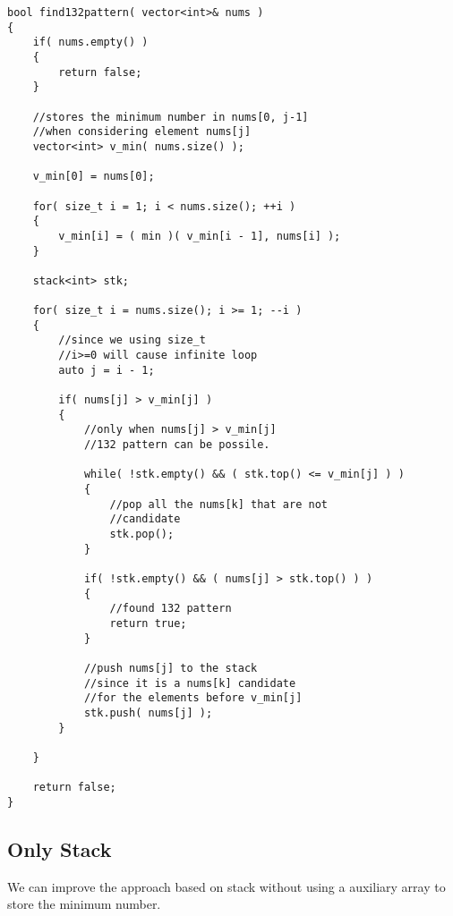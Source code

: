 \begin{lstlisting}[style=customc, caption={Stack With Minimum Number Array}]
bool find132pattern( vector<int>& nums )
{
    if( nums.empty() )
    {
        return false;
    }

    //stores the minimum number in nums[0, j-1]
    //when considering element nums[j]
    vector<int> v_min( nums.size() );

    v_min[0] = nums[0];

    for( size_t i = 1; i < nums.size(); ++i )
    {
        v_min[i] = ( min )( v_min[i - 1], nums[i] );
    }

    stack<int> stk;

    for( size_t i = nums.size(); i >= 1; --i )
    {
        //since we using size_t
        //i>=0 will cause infinite loop
        auto j = i - 1;

        if( nums[j] > v_min[j] )
        {
            //only when nums[j] > v_min[j]
            //132 pattern can be possile.

            while( !stk.empty() && ( stk.top() <= v_min[j] ) )
            {
                //pop all the nums[k] that are not
                //candidate
                stk.pop();
            }

            if( !stk.empty() && ( nums[j] > stk.top() ) )
            {
                //found 132 pattern
                return true;
            }

            //push nums[j] to the stack
            //since it is a nums[k] candidate
            //for the elements before v_min[j]
            stk.push( nums[j] );
        }

    }

    return false;
}
\end{lstlisting}
 
\subsection{Only Stack}
We can improve the approach based on stack without using a auxiliary array to store the minimum number.

